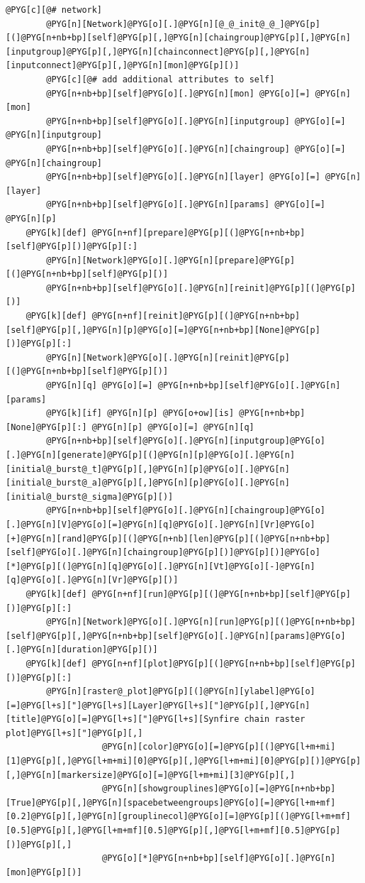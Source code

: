 \documentclass[letterpaper,10pt,english]{manual}
\begin{document}
\begin{Verbatim}[commandchars=@\[\]]
        @PYG[c][@# network]
        @PYG[n][Network]@PYG[o][.]@PYG[n][@_@_init@_@_]@PYG[p][(]@PYG[n+nb+bp][self]@PYG[p][,]@PYG[n][chaingroup]@PYG[p][,]@PYG[n][inputgroup]@PYG[p][,]@PYG[n][chainconnect]@PYG[p][,]@PYG[n][inputconnect]@PYG[p][,]@PYG[n][mon]@PYG[p][)]
        @PYG[c][@# add additional attributes to self]
        @PYG[n+nb+bp][self]@PYG[o][.]@PYG[n][mon] @PYG[o][=] @PYG[n][mon]
        @PYG[n+nb+bp][self]@PYG[o][.]@PYG[n][inputgroup] @PYG[o][=] @PYG[n][inputgroup]
        @PYG[n+nb+bp][self]@PYG[o][.]@PYG[n][chaingroup] @PYG[o][=] @PYG[n][chaingroup]
        @PYG[n+nb+bp][self]@PYG[o][.]@PYG[n][layer] @PYG[o][=] @PYG[n][layer]
        @PYG[n+nb+bp][self]@PYG[o][.]@PYG[n][params] @PYG[o][=] @PYG[n][p]
    @PYG[k][def] @PYG[n+nf][prepare]@PYG[p][(]@PYG[n+nb+bp][self]@PYG[p][)]@PYG[p][:]
        @PYG[n][Network]@PYG[o][.]@PYG[n][prepare]@PYG[p][(]@PYG[n+nb+bp][self]@PYG[p][)]
        @PYG[n+nb+bp][self]@PYG[o][.]@PYG[n][reinit]@PYG[p][(]@PYG[p][)]
    @PYG[k][def] @PYG[n+nf][reinit]@PYG[p][(]@PYG[n+nb+bp][self]@PYG[p][,]@PYG[n][p]@PYG[o][=]@PYG[n+nb+bp][None]@PYG[p][)]@PYG[p][:]
        @PYG[n][Network]@PYG[o][.]@PYG[n][reinit]@PYG[p][(]@PYG[n+nb+bp][self]@PYG[p][)]
        @PYG[n][q] @PYG[o][=] @PYG[n+nb+bp][self]@PYG[o][.]@PYG[n][params]
        @PYG[k][if] @PYG[n][p] @PYG[o+ow][is] @PYG[n+nb+bp][None]@PYG[p][:] @PYG[n][p] @PYG[o][=] @PYG[n][q]
        @PYG[n+nb+bp][self]@PYG[o][.]@PYG[n][inputgroup]@PYG[o][.]@PYG[n][generate]@PYG[p][(]@PYG[n][p]@PYG[o][.]@PYG[n][initial@_burst@_t]@PYG[p][,]@PYG[n][p]@PYG[o][.]@PYG[n][initial@_burst@_a]@PYG[p][,]@PYG[n][p]@PYG[o][.]@PYG[n][initial@_burst@_sigma]@PYG[p][)]
        @PYG[n+nb+bp][self]@PYG[o][.]@PYG[n][chaingroup]@PYG[o][.]@PYG[n][V]@PYG[o][=]@PYG[n][q]@PYG[o][.]@PYG[n][Vr]@PYG[o][+]@PYG[n][rand]@PYG[p][(]@PYG[n+nb][len]@PYG[p][(]@PYG[n+nb+bp][self]@PYG[o][.]@PYG[n][chaingroup]@PYG[p][)]@PYG[p][)]@PYG[o][*]@PYG[p][(]@PYG[n][q]@PYG[o][.]@PYG[n][Vt]@PYG[o][-]@PYG[n][q]@PYG[o][.]@PYG[n][Vr]@PYG[p][)]
    @PYG[k][def] @PYG[n+nf][run]@PYG[p][(]@PYG[n+nb+bp][self]@PYG[p][)]@PYG[p][:]
        @PYG[n][Network]@PYG[o][.]@PYG[n][run]@PYG[p][(]@PYG[n+nb+bp][self]@PYG[p][,]@PYG[n+nb+bp][self]@PYG[o][.]@PYG[n][params]@PYG[o][.]@PYG[n][duration]@PYG[p][)]
    @PYG[k][def] @PYG[n+nf][plot]@PYG[p][(]@PYG[n+nb+bp][self]@PYG[p][)]@PYG[p][:]
        @PYG[n][raster@_plot]@PYG[p][(]@PYG[n][ylabel]@PYG[o][=]@PYG[l+s]["]@PYG[l+s][Layer]@PYG[l+s]["]@PYG[p][,]@PYG[n][title]@PYG[o][=]@PYG[l+s]["]@PYG[l+s][Synfire chain raster plot]@PYG[l+s]["]@PYG[p][,]
                   @PYG[n][color]@PYG[o][=]@PYG[p][(]@PYG[l+m+mi][1]@PYG[p][,]@PYG[l+m+mi][0]@PYG[p][,]@PYG[l+m+mi][0]@PYG[p][)]@PYG[p][,]@PYG[n][markersize]@PYG[o][=]@PYG[l+m+mi][3]@PYG[p][,]
                   @PYG[n][showgrouplines]@PYG[o][=]@PYG[n+nb+bp][True]@PYG[p][,]@PYG[n][spacebetweengroups]@PYG[o][=]@PYG[l+m+mf][0.2]@PYG[p][,]@PYG[n][grouplinecol]@PYG[o][=]@PYG[p][(]@PYG[l+m+mf][0.5]@PYG[p][,]@PYG[l+m+mf][0.5]@PYG[p][,]@PYG[l+m+mf][0.5]@PYG[p][)]@PYG[p][,]
                   @PYG[o][*]@PYG[n+nb+bp][self]@PYG[o][.]@PYG[n][mon]@PYG[p][)]


\end{Verbatim}
\end{document}
